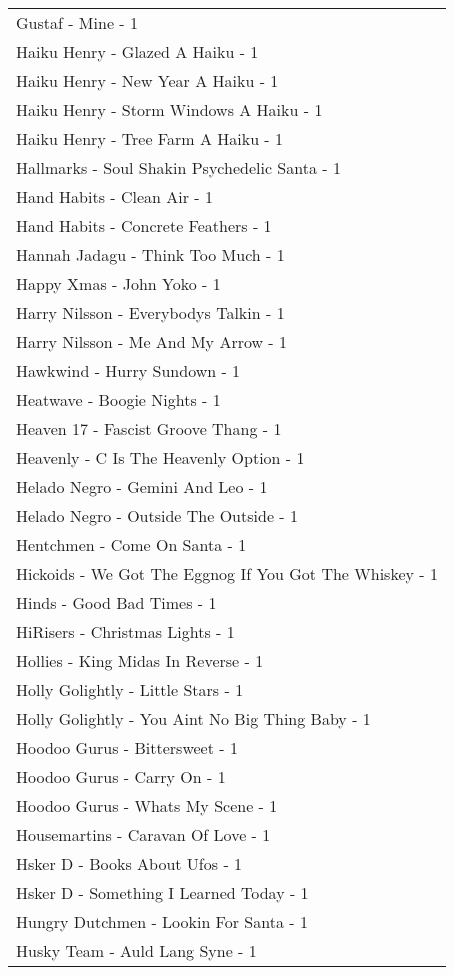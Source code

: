 \documentclass[
]{article}
\begin{document}
\begin{longtable}{l}
Gustaf - Mine - 1 \\ 
Haiku Henry - Glazed A Haiku - 1 \\ 
Haiku Henry - New Year A Haiku - 1 \\ 
Haiku Henry - Storm Windows A Haiku - 1 \\ 
Haiku Henry - Tree Farm A Haiku - 1 \\ 
Hallmarks - Soul Shakin Psychedelic Santa - 1 \\ 
Hand Habits - Clean Air - 1 \\ 
Hand Habits - Concrete Feathers - 1 \\ 
Hannah Jadagu - Think Too Much - 1 \\ 
Happy Xmas - John Yoko - 1 \\ 
Harry Nilsson - Everybodys Talkin - 1 \\ 
Harry Nilsson - Me And My Arrow - 1 \\ 
Hawkwind - Hurry Sundown - 1 \\ 
Heatwave - Boogie Nights - 1 \\ 
Heaven 17 - Fascist Groove Thang - 1 \\ 
Heavenly - C Is The Heavenly Option - 1 \\ 
Helado Negro - Gemini And Leo - 1 \\ 
Helado Negro - Outside The Outside - 1 \\ 
Hentchmen - Come On Santa - 1 \\ 
Hickoids - We Got The Eggnog If You Got The Whiskey - 1 \\ 
Hinds - Good Bad Times - 1 \\ 
HiRisers - Christmas Lights - 1 \\ 
Hollies - King Midas In Reverse - 1 \\ 
Holly Golightly - Little Stars - 1 \\ 
Holly Golightly - You Aint No Big Thing Baby - 1 \\ 
Hoodoo Gurus - Bittersweet - 1 \\ 
Hoodoo Gurus - Carry On - 1 \\ 
Hoodoo Gurus - Whats My Scene - 1 \\ 
Housemartins - Caravan Of Love - 1 \\ 
Hsker D - Books About Ufos - 1 \\ 
Hsker D - Something I Learned Today - 1 \\ 
Hungry Dutchmen - Lookin For Santa - 1 \\ 
Husky Team - Auld Lang Syne - 1 \\ 

\end{longtable}
\end{document}
